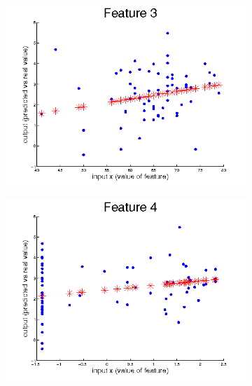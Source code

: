 \documentclass{article}
\begin{document}
	\begin{figure}[H]
	  \begin{subfigure}
	    \centering
	    \includegraphics[scale=0.4,bb=0 0 576 432]{task2-feature3.png}
	  \end{subfigure}
	  \begin{subfigure}
	    \centering
	    \includegraphics[scale=0.4,bb=0 0 576 432]{task2-feature4.png}
	  \end{subfigure}
	\end{figure}
\end{document}
